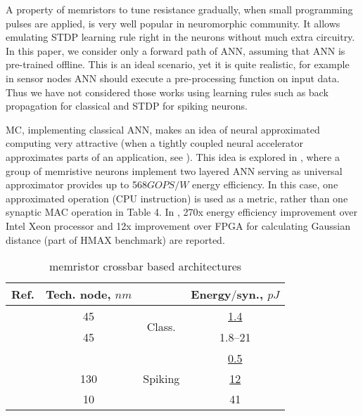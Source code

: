 \documentclass[conference, compsoc]{IEEEtran}
\begin{document}
A property of memristors to tune resistance gradually, when small programming pulses are applied, is very well popular in neuromorphic community. It allows emulating STDP learning rule right in the neurons without much extra circuitry. In this paper, we consider only a forward path of ANN, assuming that ANN is pre-trained offline. This is an ideal scenario, yet it is quite realistic, for example in sensor nodes ANN should  execute a pre-processing function on input data. Thus we have not considered  those works using learning rules such as back propagation for classical and STDP for spiking neurons.

MC, implementing classical ANN, makes an idea of neural approximated computing very attractive (when a tightly coupled neural accelerator approximates parts of an application, see \cite{Esmaeilzadeh:Approximate,Esmaeilzadeh:Approximate_analog}). This idea is explored in \cite{Memristor_approximated,RRAM_approximated}, where a group of memristive neurons implement two layered ANN serving as universal approximator provides up to 568$ GOPS/W $ energy efficiency. In this case, one approximated operation (CPU instruction) is used as a metric, rather than one synaptic MAC operation in Table 4. In \cite{Memristor_approximated}, 270x energy efficiency improvement over Intel Xeon processor and 12x improvement over FPGA for calculating Gaussian distance (part of HMAX benchmark) are reported.
\begin{table}[h]
	\caption{memristor crossbar based architectures}
	\label{table:4}
	\centering
	\setlength{\tabcolsep}{5pt}
	\setlength\extrarowheight{1pt}
	\begin{tabular} {|c|c|c|c|}
		\hline Ref. &  \pbox[t]{40pt}{Tech. node,\\ $ nm $} & & \pbox[t]{45pt}{Energy$ / $syn.,\\ $ pJ $}\\ 
		\hline \cite{STT_SNN} & 45 & \multirow{2}{*}{\begin{turn}{90}Class.\end{turn}} & \underline{1.4} \\
		\cline{1-2}\cline{4-4} \cite{Segmented_memristor} & 45 &  & 1.8--21 \\
		\hline \cite{Can_we_use_SNN_RRAM} &  & \multirow{3}{*}{\begin{turn}{90}Spiking\end{turn}} & \underline{0.5} \\
		\cline{1-2}\cline{4-4} \cite{Spiking_resistive_crossbar} & 130 &  & \underline{12} \\
		\cline{1-2}\cline{4-4} \cite{Rajendran:specification_of_nanosscale} & 10 &  & 41 \\
		\hline
	\end{tabular} 
\end{table}
\end{document}
